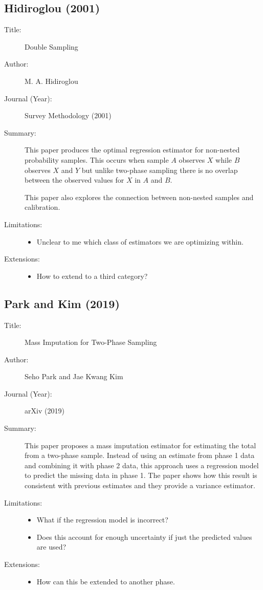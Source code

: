 \documentclass[12pt]{article}
\begin{document}
\subsection*{Hidiroglou (2001)}
\begin{description}
  \item[Title:] Double Sampling
  \item[Author:] M. A. Hidiroglou
  \item[Journal (Year):] Survey Methodology (2001)
  \item[Summary:] This paper produces the optimal regression estimator for 
    non-nested probability samples. This occurs when sample $A$ observes $X$ 
    while $B$ observes $X$ and $Y$ but unlike two-phase sampling there is no
    overlap between the observed values for $X$ in $A$ and $B$.

    This paper also explores the connection between non-nested samples and 
    calibration.
  \item[Limitations:]\;
    \begin{itemize}
      \item Unclear to me which class of estimators we are optimizing within.
    \end{itemize}
  \item[Extensions:]\;
    \begin{itemize}
      \item How to extend to a third category?
    \end{itemize}
\end{description}

\subsection*{Park and Kim (2019)}
\begin{description}
  \item[Title:] Mass Imputation for Two-Phase Sampling
  \item[Author:] Seho Park and Jae Kwang Kim
  \item[Journal (Year):] arXiv (2019)
  \item[Summary:] This paper proposes a mass imputation estimator for 
    estimating the total from a two-phase sample. Instead of using an
    estimate from phase 1 data and combining it with phase 2 data, this
    approach uses a regression model to predict the missing data in phase 
    1. The paper shows how this result is consistent with previous 
    estimates and they provide a variance estimator.
  \item[Limitations:]\;
    \begin{itemize}
      \item What if the regression model is incorrect?
      \item Does this account for enough uncertainty if just the predicted
        values are used?
    \end{itemize}
  \item[Extensions:]\;
    \begin{itemize}
      \item How can this be extended to another phase.
    \end{itemize}
\end{description}
\end{document}

